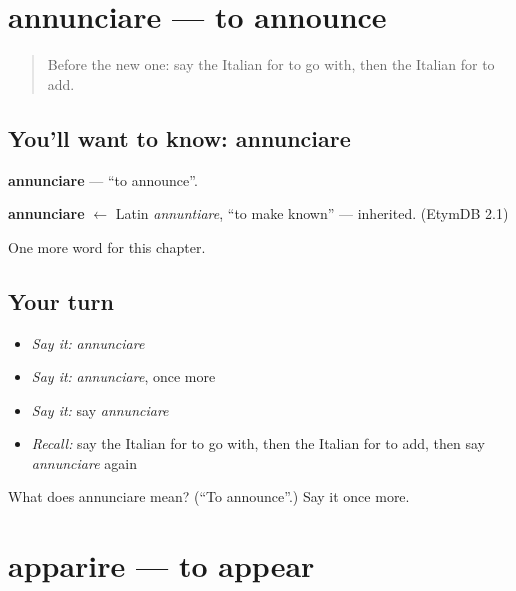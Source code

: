 \section[annunciare]{annunciare — to announce}

\label{lesson:IT-C178-annunciare}



\begin{quote}
Before the new one: say the Italian for to go with, then the Italian for to add.
\end{quote}

\subsection*{You'll want to know: annunciare}
\textbf{annunciare} — \textquotedblleft{}to announce\textquotedblright{}.

\begin{cousinweb}
\textbf{annunciare} $\leftarrow$ Latin \emph{annuntiare}, \textquotedblleft{}to make known\textquotedblright{} — inherited. (EtymDB 2.1)
\end{cousinweb}

\begin{grammarlens}[title={What you've built}]
One more word for this chapter.
\end{grammarlens}

\subsection*{Your turn}
\begin{itemize}
\raggedright
  \item \emph{Say it:} \emph{annunciare}
  \item \emph{Say it:} \emph{annunciare}, once more
  \item \emph{Say it:} say \emph{annunciare}
  \item \emph{Recall:} say the Italian for to go with, then the Italian for to add, then say \emph{annunciare} again
\end{itemize}

\begin{tcolorbox}[breakable,colback=teal!4,colframe=teal!35!black,title={Before you move on}]
What does annunciare mean? (\textquotedblleft{}To announce\textquotedblright{}.) Say it once more.
\end{tcolorbox}
\section[apparire]{apparire — to appear}

